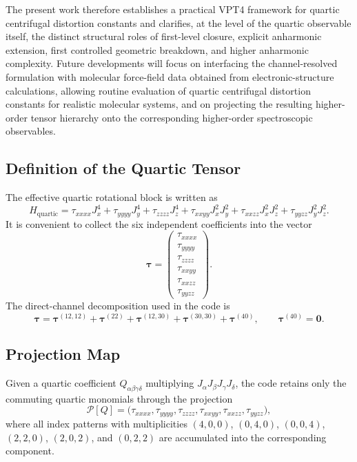 \documentclass[aip,jcp,reprint]{revtex4-2}
\begin{document}
The present work therefore establishes a practical VPT4 framework for
quartic centrifugal distortion constants and clarifies, at the level of
the quartic observable itself, the distinct structural roles of
first-level closure, explicit anharmonic extension, first controlled
geometric breakdown, and higher anharmonic complexity.
Future developments will focus on interfacing the channel-resolved
formulation with molecular force-field data obtained from
electronic-structure calculations, allowing routine evaluation of
quartic centrifugal distortion constants for realistic molecular systems,
and on projecting the resulting higher-order tensor hierarchy onto the
corresponding higher-order spectroscopic observables.


\appendix
\begin{widetext}

\section{Definition of the Quartic Tensor}
The effective quartic rotational block is written as
\begin{equation}
H_{\mathrm{quartic}} = \tau_{xxxx} J_x^4 + \tau_{yyyy} J_y^4 + \tau_{zzzz} J_z^4
+ \tau_{xxyy} J_x^2 J_y^2 + \tau_{xxzz} J_x^2 J_z^2 + \tau_{yyzz} J_y^2 J_z^2.
\end{equation}
It is convenient to collect the six independent coefficients into the vector
\begin{equation}
\bm{\tau} =
\begin{pmatrix}
\tau_{xxxx} \\
\tau_{yyyy} \\
\tau_{zzzz} \\
\tau_{xxyy} \\
\tau_{xxzz} \\
\tau_{yyzz}
\end{pmatrix}.
\end{equation}
The direct-channel decomposition used in the code is
\begin{equation}
\bm{\tau} =
\bm{\tau}^{(12,12)} +
\bm{\tau}^{(22)} +
\bm{\tau}^{(12,30)} +
\bm{\tau}^{(30,30)} +
\bm{\tau}^{(40)},
\qquad
\bm{\tau}^{(40)} = \bm{0}.
\end{equation}

\subsection{Projection Map}
Given a quartic coefficient $Q_{\alpha\beta\gamma\delta}$ multiplying
$J_\alpha J_\beta J_\gamma J_\delta$, the code retains only the commuting quartic
monomials through the projection
\begin{equation}
\mathcal{P}[Q] =
\bigl(\tau_{xxxx},\tau_{yyyy},\tau_{zzzz},\tau_{xxyy},\tau_{xxzz},\tau_{yyzz}\bigr),
\end{equation}
where all index patterns with multiplicities $(4,0,0)$, $(0,4,0)$, $(0,0,4)$,
$(2,2,0)$, $(2,0,2)$, and $(0,2,2)$ are accumulated into the corresponding
component.


\end{widetext}
\end{document}
